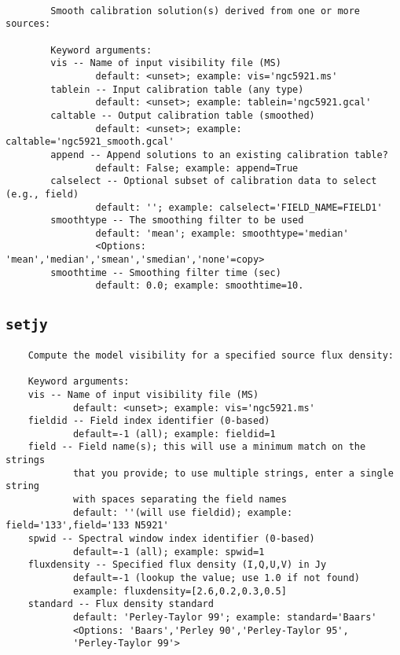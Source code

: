 \small
\begin{verbatim}

        Smooth calibration solution(s) derived from one or more sources:
        
        Keyword arguments:
        vis -- Name of input visibility file (MS)
                default: <unset>; example: vis='ngc5921.ms'
        tablein -- Input calibration table (any type)
                default: <unset>; example: tablein='ngc5921.gcal'
        caltable -- Output calibration table (smoothed)
                default: <unset>; example: caltable='ngc5921_smooth.gcal'
        append -- Append solutions to an existing calibration table?
                default: False; example: append=True
        calselect -- Optional subset of calibration data to select (e.g., field)
                default: ''; example: calselect='FIELD_NAME=FIELD1'
        smoothtype -- The smoothing filter to be used
                default: 'mean'; example: smoothtype='median'
                <Options: 'mean','median','smean','smedian','none'=copy>
        smoothtime -- Smoothing filter time (sec)
                default: 0.0; example: smoothtime=10.
\end{verbatim}
\normalsize


\subsection{{\tt setjy}}
\label{section:tasks.setjy}

\small
\begin{verbatim}
    Compute the model visibility for a specified source flux density: 
    
    Keyword arguments:
    vis -- Name of input visibility file (MS)
            default: <unset>; example: vis='ngc5921.ms'
    fieldid -- Field index identifier (0-based)
            default=-1 (all); example: fieldid=1
    field -- Field name(s); this will use a minimum match on the strings
            that you provide; to use multiple strings, enter a single string
            with spaces separating the field names
            default: ''(will use fieldid); example: field='133',field='133 N5921'
    spwid -- Spectral window index identifier (0-based)
            default=-1 (all); example: spwid=1
    fluxdensity -- Specified flux density (I,Q,U,V) in Jy
            default=-1 (lookup the value; use 1.0 if not found)
            example: fluxdensity=[2.6,0.2,0.3,0.5]
    standard -- Flux density standard
            default: 'Perley-Taylor 99'; example: standard='Baars'
            <Options: 'Baars','Perley 90','Perley-Taylor 95',
            'Perley-Taylor 99'>
\end{verbatim}
\normalsize



